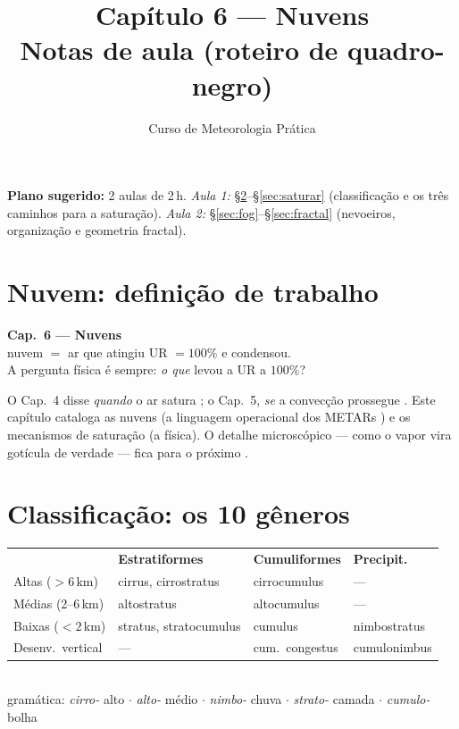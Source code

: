 \documentclass[11pt]{article}
\title{Capítulo 6 --- Nuvens\\
{\large Notas de aula (roteiro de quadro-negro)}}
\author{Curso de Meteorologia Prática}
\date{}
\begin{document}
\maketitle
\thispagestyle{fancy}

\noindent\textbf{Plano sugerido:} 2 aulas de 2\,h.
\emph{Aula 1:} \S\ref{sec:class}--\S\ref{sec:saturar} (classificação e os
três caminhos para a saturação).
\emph{Aula 2:} \S\ref{sec:fog}--\S\ref{sec:fractal} (nevoeiros,
organização e geometria fractal).

\section{Nuvem: definição de trabalho}

\begin{noquadro}[abertura]
\textbf{Cap.~6 --- Nuvens}\\[2pt]
nuvem $=$ ar que atingiu UR $= 100\%$ e condensou.\\[2pt]
A pergunta física é sempre: \emph{o que} levou a UR a $100\%$?
\end{noquadro}

O Cap.~4 disse \emph{quando} o ar satura ; o
Cap.~5, \emph{se} a convecção prossegue . Este
capítulo cataloga as nuvens (a linguagem operacional dos METARs
) e os mecanismos de saturação (a física).
O detalhe microscópico — como o vapor vira gotícula de verdade — fica
para o próximo .

\section{Classificação: os 10 gêneros}\label{sec:class}


\begin{noquadro}[os 10 gêneros]
\begin{tabular}{llll}
 & \textbf{Estratiformes} & \textbf{Cumuliformes} & \textbf{Precipit.} \\
Altas ($>6$\,km) & cirrus, cirrostratus & cirrocumulus & --- \\
Médias (2--6\,km) & altostratus & altocumulus & --- \\
Baixas ($<2$\,km) & stratus, stratocumulus & cumulus & nimbostratus \\
Desenv.\ vertical & --- & cum.\ congestus & cumulonimbus \\
\end{tabular}\\[4pt]
gramática: \emph{cirro-} alto $\cdot$ \emph{alto-} médio $\cdot$
\emph{nimbo-} chuva $\cdot$ \emph{strato-} camada $\cdot$
\emph{cumulo-} bolha
\end{noquadro}
\end{document}

